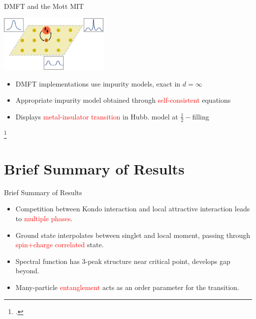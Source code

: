\documentclass[11pt,aspectratio=169]{beamer}
\newcommand{\focus}[1]{\textcolor{red}{#1}}
\begin{document}
\begin{frame}{DMFT and the Mott MIT}
\centering

\includegraphics[width=0.4\textwidth]{figures/DMFT.pdf}

\vspace*{\fill}

\begin{itemize}
\item DMFT implementations use impurity models, exact in $d=\infty$\\[10pt]
\item Appropriate impurity model obtained through \focus{self-consistent} equations\\[10pt]
\item Displays \focus{metal-insulator transition} in Hubb. model at \(\frac{1}{2}-\)filling
\end{itemize}

\footcite*{metzner_volhardt_1989,georges_kotliar_1992,hubbard1963electron,Mott_1949}
\end{frame}

\section{Brief Summary of Results}
\begin{frame}{Brief Summary of Results}
\begin{itemize}
	\item Competition between Kondo interaction and local attractive interaction leads to \focus{multiple phases}.\\[10pt]
	\item Ground state interpolates between singlet and local moment, passing through \focus{spin+charge correlated} state.\\[10pt]
	\item Spectral function has 3-peak structure near critical point, develops gap beyond.\\[10pt]
	\item Many-particle \focus{entanglement} acts as an order parameter for the transition.
\end{itemize}
\end{frame}
\end{document}
